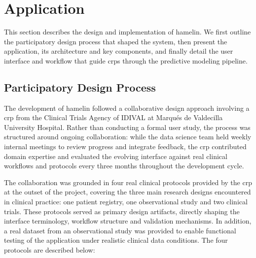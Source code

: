\documentclass[conference,twocolumn]{IEEEtran}
\begin{document}
\section{Application}  
\label{sec:application}

This section describes the design and implementation of \gls{hamelin}. We first outline the participatory design process that shaped the system, then present the application, its architecture and key components, and finally detail the user interface and workflow that guide \glspl{crp} through the predictive modeling pipeline.

\subsection{Participatory Design Process}
\label{subsec:design_process}
  
The development of \gls{hamelin} followed a collaborative design approach involving 
a \gls{crp} from the Clinical Trials Agency of IDIVAL at Marqu\'es de Valdecilla University Hospital. Rather than 
conducting a formal user study, the process was structured around ongoing 
collaboration: while the data science team held weekly internal meetings to review progress and integrate feedback, the \gls{crp} contributed domain expertise and evaluated the evolving interface against real clinical workflows and protocols every three months throughout the development cycle.

The collaboration was grounded in four real clinical protocols provided by the 
\gls{crp} at the outset of the project, covering the three main research designs 
encountered in clinical practice: one patient registry, one observational study and 
two clinical trials. These protocols served as primary design artifacts, directly 
shaping the interface terminology, workflow structure and validation mechanisms. In 
addition, a real dataset from an observational study was provided to enable functional 
testing of the application under realistic clinical data conditions. The four protocols are described below:
\end{document}
